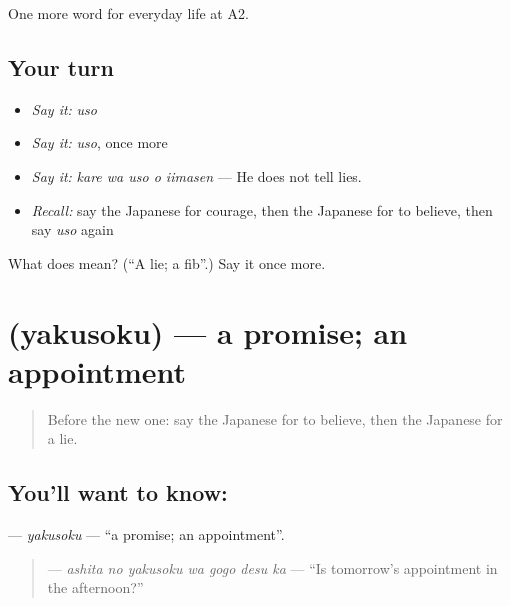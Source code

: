 \begin{grammarlens}[title={What you've built}]
One more word for everyday life at A2.
\end{grammarlens}

\subsection*{Your turn}
\begin{itemize}
\raggedright
  \item \emph{Say it:} \emph{uso}
  \item \emph{Say it:} \emph{uso}, once more
  \item \emph{Say it:} \emph{kare wa uso o iimasen} — He does not tell lies.
  \item \emph{Recall:} say the Japanese for courage, then the Japanese for to believe, then say \emph{uso} again
\end{itemize}

\begin{tcolorbox}[breakable,colback=teal!4,colframe=teal!35!black,title={Before you move on}]
What does  mean? (\textquotedblleft{}A lie; a fib\textquotedblright{}.) Say it once more.
\end{tcolorbox}
\section[\texorpdfstring{\ja{やくそく} (yakusoku)}{やくそく (yakusoku)}]{ (yakusoku) — a promise; an appointment}

\label{lesson:JA-C248-yakusoku}



\begin{quote}
Before the new one: say the Japanese for to believe, then the Japanese for a lie.
\end{quote}

\subsection*{You'll want to know: }
\textbf{} — \emph{yakusoku} — \textquotedblleft{}a promise; an appointment\textquotedblright{}.

\begin{quote}
\textbf{  } — \emph{ashita no yakusoku wa gogo desu ka} — \textquotedblleft{}Is tomorrow's appointment in the afternoon?\textquotedblright{}
\end{quote}

